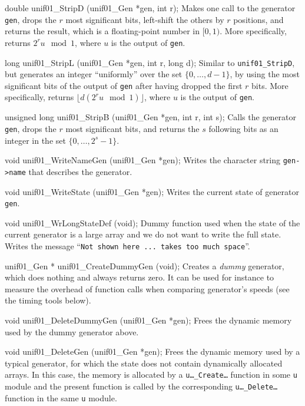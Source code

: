 
\code


double unif01_StripD (unif01_Gen *gen, int r);
\endcode
\tab Makes one call to the generator {\tt gen}, drops the $r$ most
  significant bits, left-shift the others by $r$ positions, and
  returns the result, which is a floating-point number in $[0,1)$.
 More specifically, returns $2^r u \mod 1$, 
 where $u$ is the output of {\tt gen}.
 \endtab
\code


long unif01_StripL (unif01_Gen *gen, int r, long d);
\endcode
\tab
 Similar to {\tt unif01\_StripD}, but generates an integer ``uniformly'' over
 the set $\{0,\dots,d-1\}$, by using the most significant bits of the
 output of {\tt gen} after having dropped the first $r$ bits.
 More specifically, returns $\lfloor d (2^r u \mod 1)\rfloor$, 
 where $u$ is the output of {\tt gen}.
\endtab
\code


unsigned long unif01_StripB (unif01_Gen *gen, int r, int s);
\endcode
\tab
 Calls the generator {\tt gen}, drops the $r$ most significant bits,
 and returns the $s$ following bits as an integer in 
 the set $\{0,\dots,2^s-1\}$.
\endtab
\code


void unif01_WriteNameGen (unif01_Gen *gen);
\endcode
 \tab  Writes the character string {\tt gen->name} that describes the
  generator.
 \endtab
\code


void unif01_WriteState (unif01_Gen *gen);
\endcode
 \tab  Writes the current state of generator  {\tt gen}.
 \endtab
\code


void unif01_WrLongStateDef (void);
\endcode
 \tab Dummy function used when the state of the current
   generator is a large array and we do not want to write the full state.
   Writes the message ``{\tt   Not shown here ... takes too much space}''.
 \endtab
\code


unif01_Gen * unif01_CreateDummyGen (void);
\endcode
\tab  Creates a {\em dummy\/} generator, which does nothing and always
%
  returns zero. It can be used for instance to measure the overhead of
  function calls when comparing generator's speeds
  (see the timing tools below).
\endtab
\code


void unif01_DeleteDummyGen (unif01_Gen *gen);
\endcode
\tab  Frees the dynamic memory used by the dummy generator above.
\endtab
\ifdetailed
\code


void unif01_DeleteGen (unif01_Gen *gen); 
\endcode 
\tab  Frees the dynamic memory used by a typical generator, for which
  the state does not contain dynamically allocated arrays. 
  In this case, the memory
  is allocated by a {\tt u\ldots\_Create\ldots} function in some
  {\tt u} module and the present function is called by the corresponding
  {\tt u\ldots\_Delete\ldots} function in the same {\tt u} module.
\endtab
\fi



